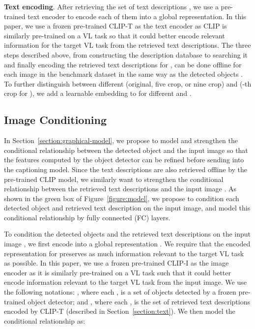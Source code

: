 \documentclass[10pt,twocolumn,letterpaper]{article}
\begin{document}
\textbf{Text encoding}.
After retrieving the set of text descriptions , we use a pre-trained text encoder to encode each of them into a global representation.
In this paper, we use a frozen pre-trained CLIP-T as the text encoder as CLIP is similarly pre-trained on a VL task so that it could better encode relevant information for the target VL task from the retrieved text descriptions.
The three steps described above, from constructing the description database to searching it and finally encoding the retrieved text descriptions for , can be done offline for each image in the benchmark dataset in the same way as the detected objects .
To further distinguish between different  (original, five crop, or nine crop) and  (-th crop for ), we add a learnable embedding to  for different  and .


\subsection{Image Conditioning} \label{section:image}

In Section~\ref{section:graphical-model}, we propose to model and strengthen the conditional relationship between the detected object  and the input image  so that the features computed by the object detector can be refined before sending into the captioning model.
Since the text descriptions are also retrieved offline by the pre-trained CLIP model, we similarly want to strengthen the conditional relationship between the retrieved text descriptions  and the input image .
As shown in the green box of Figure~\ref{figure:model}, we propose to condition each detected object and retrieved text description on the input image, and model this conditional relationship by fully connected (FC) layers.

To condition the detected objects  and the retrieved text descriptions  on the input image , we first encode  into a global representation .
We require that the encoded representation for  preserves as much information relevant to the target VL task as possible.
In this paper, we use a frozen pre-trained CLIP-I as the image encoder as it is similarly pre-trained on a VL task such that it could better encode information relevant to the target VL task from the input image.
We use the following notations: , where each , is a set of objects detected by a frozen pre-trained object detector;
and , where each , is the set of retrieved text descriptions encoded by CLIP-T (described in Section~\ref{section:text}).
We then model the conditional relationship as:
\end{document}
